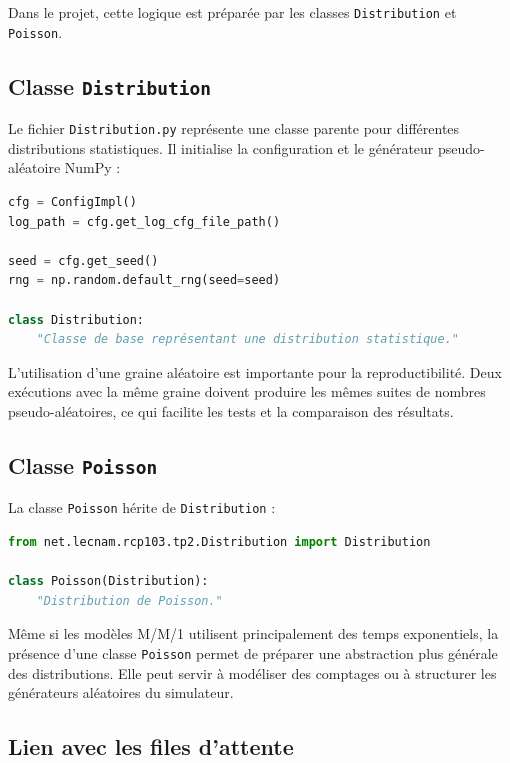 \documentclass{article}
\begin{document}
Dans le projet, cette logique est préparée par les classes \texttt{Distribution} et \texttt{Poisson}.

\subsection{Classe \texttt{Distribution}}

Le fichier \texttt{Distribution.py} représente une classe parente pour différentes distributions statistiques. Il initialise la configuration et le générateur pseudo-aléatoire NumPy :

\begin{lstlisting}[language=Python, caption=Extrait conceptuel de Distribution.py]
cfg = ConfigImpl()
log_path = cfg.get_log_cfg_file_path()

seed = cfg.get_seed()
rng = np.random.default_rng(seed=seed)

class Distribution:
    "Classe de base représentant une distribution statistique."
\end{lstlisting}

L’utilisation d’une graine aléatoire est importante pour la reproductibilité. Deux exécutions avec la même graine doivent produire les mêmes suites de nombres pseudo-aléatoires, ce qui facilite les tests et la comparaison des résultats.

\subsection{Classe \texttt{Poisson}}

La classe \texttt{Poisson} hérite de \texttt{Distribution} :

\begin{lstlisting}[language=Python, caption=Extrait conceptuel de Poisson.py]
from net.lecnam.rcp103.tp2.Distribution import Distribution

class Poisson(Distribution):
    "Distribution de Poisson."
\end{lstlisting}

Même si les modèles M/M/1 utilisent principalement des temps exponentiels, la présence d’une classe \texttt{Poisson} permet de préparer une abstraction plus générale des distributions. Elle peut servir à modéliser des comptages ou à structurer les générateurs aléatoires du simulateur.

\subsection{Lien avec les files d’attente}
\end{document}
